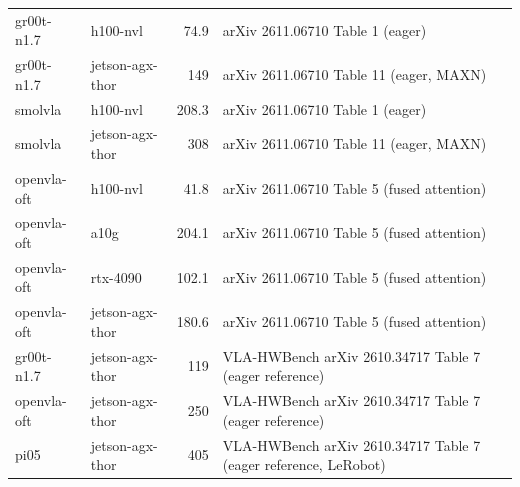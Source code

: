 {\begin{tabular}{llrp{9.2cm}}
gr00t-n1.7 & h100-nvl & 74.9 & arXiv 2611.06710 Table 1 (eager) \\
gr00t-n1.7 & jetson-agx-thor & 149 & arXiv 2611.06710 Table 11 (eager, MAXN) \\
smolvla & h100-nvl & 208.3 & arXiv 2611.06710 Table 1 (eager) \\
smolvla & jetson-agx-thor & 308 & arXiv 2611.06710 Table 11 (eager, MAXN) \\
openvla-oft & h100-nvl & 41.8 & arXiv 2611.06710 Table 5 (fused attention) \\
openvla-oft & a10g & 204.1 & arXiv 2611.06710 Table 5 (fused attention) \\
openvla-oft & rtx-4090 & 102.1 & arXiv 2611.06710 Table 5 (fused attention) \\
openvla-oft & jetson-agx-thor & 180.6 & arXiv 2611.06710 Table 5 (fused attention) \\
gr00t-n1.7 & jetson-agx-thor & 119 & VLA-HWBench arXiv 2610.34717 Table 7 (eager reference) \\
openvla-oft & jetson-agx-thor & 250 & VLA-HWBench arXiv 2610.34717 Table 7 (eager reference) \\
pi05 & jetson-agx-thor & 405 & VLA-HWBench arXiv 2610.34717 Table 7 (eager reference, LeRobot) \\
\bottomrule
\end{tabular}}
